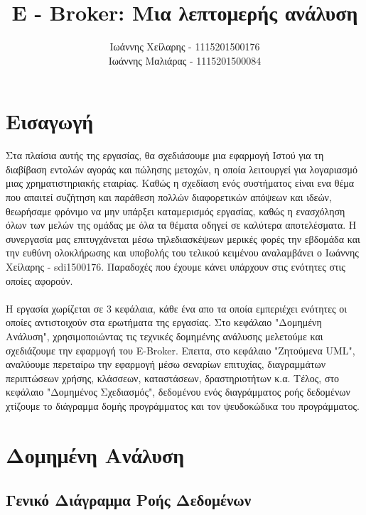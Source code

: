\documentclass{article}
\begin{document}

\title{E - Broker: Μια λεπτομερής ανάλυση}
\author{
	Ιωάννης Χείλαρης - 1115201500176
	\\
	Ιωάννης Μαλιάρας - 1115201500084
}

\maketitle

\newpage
\tableofcontents


\newpage
\section{Εισαγωγή}
	Στα πλαίσια αυτής της εργασίας, θα σχεδιάσουμε μια εφαρμογή Ιστού 
	για τη διαβίβαση εντολών αγοράς και πώλησης μετοχών, 
	η οποία λειτουργεί για λογαριασμό μιας χρηματιστηριακής εταιρίας.
	Καθώς η σχεδίαση ενός συστήματος είναι ενα θέμα που απαιτεί συζήτηση και παράθεση πολλών διαφορετικών απόψεων και ιδεών, θεωρήσαμε φρόνιμο
	να μην υπάρξει καταμερισμός εργασίας, καθώς η ενασχόληση όλων των μελών της ομάδας με όλα τα θέματα οδηγεί σε καλύτερα αποτελέσματα.
	Η συνεργασία μας επιτυγχάνεται μέσω τηλεδιασκέψεων μερικές φορές την εβδομάδα και την ευθύνη ολοκλήρωσης και υποβολής του τελικού κειμένου
	αναλαμβάνει ο Ιωάννης Χείλαρης - sdi1500176. Παραδοχές που έχουμε κάνει υπάρχουν στις ενότητες στις οποίες αφορούν.
  \\\\
	Η εργασία χωρίζεται σε 3 κεφάλαια, κάθε ένα απο τα οποία εμπεριέχει ενότητες οι οποίες αντιστοιχούν στα ερωτήματα της εργασίας. Στο κεφάλαιο
	"Δομημένη Ανάλυση", χρησιμοποιώντας τις τεχνικές δομημένης ανάλυσης μελετούμε και σχεδιάζουμε την εφαρμογή του E-Broker. Επειτα, στο κεφάλαιο
	"Ζητούμενα UML", αναλύουμε περεταίρω την εφαρμογή μέσω σεναρίων επιτυχίας, διαγραμμάτων περιπτώσεων χρήσης, κλάσσεων, καταστάσεων, δραστηριοτήτων κ.α.
	Τέλος, στο κεφάλαιο "Δομημένος Σχεδιασμός", δεδομένου ενός διαγράμματος ροής δεδομένων χτίζουμε το διάγραμμα δομής προγράμματος και τον ψευδοκώδικα του προγράμματος.
	
  
	
\newpage
\section{Δομημένη Ανάλυση}
	\subsection{Γενικό Διάγραμμα Ροής Δεδομένων}
\end{document}
